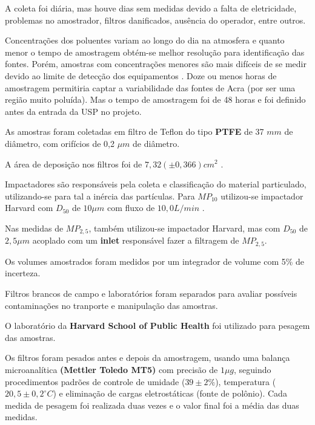 A coleta foi diária, mas houve dias sem medidas devido a falta de eletricidade,
problemas no amostrador, filtros danificados, ausência do operador, entre outros. 

Concentrações dos poluentes variam ao longo do dia na atmosfera
e quanto menor o tempo de amostragem obtém-se melhor resolução 
para identificação das fontes. Porém, amostras com concentrações menores 
são mais difíceis de se medir devido ao limite de detecção dos equipamentos
\citep{calzolai2015}. Doze ou menos horas de amostragem permitiria captar 
a variabilidade das fontes de Acra (por ser uma região muito poluída).
Mas o tempo de amostragem foi de 48 horas e foi definido antes da 
entrada da USP no projeto.

As amostras  foram coletadas em filtro de Teflon do tipo 
\textbf{PTFE} de 37 $mm$ de diâmetro, com orifícios de 0,2 $\mu m$ de diâmetro. 

A área de deposição nos filtros foi de $7,32 (\pm 0,366) cm^2$ .

Impactadores são responsáveis pela coleta e classificação 
do material particulado, utilizando-se para tal a inércia das
partículas.
Para $MP_{10}$ utilizou-se impactador Harvard com $D_{50}$ de $10 \mu m$ 
com fluxo de $10,0 L/min$ \citep{marple1987}. 

Nas medidas de $MP_{2,5}$, também utilizou-se impactador Harvard, 
mas com $D_{50}$ de $2,5 \mu m$ acoplado com um \textbf{inlet} 
responsável fazer a filtragem de $MP_{2,5}$.

Os volumes amostrados foram medidos por um integrador de volume
com 5\% de incerteza.

Filtros brancos de campo e laboratórios foram separados para avaliar 
possíveis contaminações no tranporte e manipulação das amostras. 

O laboratório da \textbf{Harvard School of Public Health} foi
utilizado para pesagem das amostras.

Os filtros foram pesados antes e depois da amostragem, usando uma balança 
microanalítica \textbf{(Mettler Toledo MT5)} com precisão de $1 \mu g$, 
seguindo procedimentos padrões de controle de umidade ($39 \pm 2 \%$), 
temperatura ($20,5 \pm 0,2 ^{\circ} C$) e eliminação de cargas eletrostáticas 
(fonte de polônio). 
Cada medida de pesagem foi realizada duas vezes e o valor final foi a média das 
duas medidas. 

